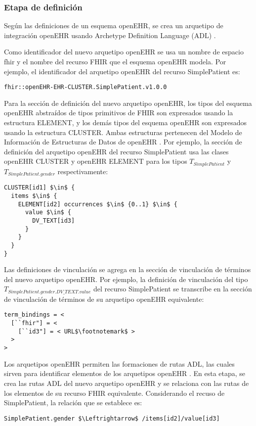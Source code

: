 \subsubsection{Etapa de definición}

Según las definiciones de un esquema openEHR, se crea un arquetipo de integración openEHR usando Archetype Definition Language (ADL) \cite{openEHRADL}.

Como identificador del nuevo arquetipo openEHR se usa un nombre de espacio fhir y el nombre del recurso FHIR que el esquema openEHR modela. Por ejemplo, el identificador del arquetipo openEHR del recurso SimplePatient es:

\begin{lstlisting}
fhir::openEHR-EHR-CLUSTER.SimplePatient.v1.0.0
\end{lstlisting}

Para la sección de definición del nuevo arquetipo openEHR, los tipos del esquema openEHR abstraídos de tipos primitivos de FHIR son expresados usando la estructura ELEMENT, y los demás tipos del esquema openEHR son expresados usando la estructura CLUSTER. Ambas estructuras pertenecen del Modelo de Información de Estructuras de Datos de openEHR \cite{openEHRDataStructures}. Por ejemplo, la sección de definición del arquetipo openEHR del recurso SimplePatient usa las clases openEHR CLUSTER y openEHR ELEMENT para los tipos \(T_{SimplePatient}\) y \(T_{SimplePatient.gender}\) respectivamente:

\begin{lstlisting}[mathescape=true]
CLUSTER[id1] $\in$ {
  items $\in$ {
    ELEMENT[id2] occurrences $\in$ {0..1} $\in$ {
      value $\in$ {
        DV_TEXT[id3]
      }
    }
  }
}
\end{lstlisting}

Las definiciones de vinculación se agrega en la sección de vinculación de términos del nuevo arquetipo openEHR. Por ejemplo, la definición de vinculación del tipo \(T_{SimplePatient.gender.DV\_TEXT.value}\) del recurso SimplePatient se transcribe en la sección de vinculación de términos de su arquetipo openEHR equivalente:

\begin{lstlisting}[escapechar=$]
term_bindings = <
  [``fhir"] = <
    [``id3"] = < URL$\footnotemark$ >
  >
>
\end{lstlisting}


Los arquetipos openEHR permiten las formaciones de rutas ADL, las cuales sirven para identificar elementos de los arquetipos openEHR \cite{openEHRArchitecture}. En esta etapa, se crea las rutas ADL del nuevo arquetipo openEHR y se relaciona con las rutas de los elementos de su recurso FHIR equivalente. Considerando el recuso de SimplePatient, la relación que se establece es:

\begin{lstlisting}[mathescape=true]
SimplePatient.gender $\Leftrightarrow$ /items[id2]/value[id3]
\end{lstlisting}
